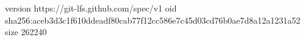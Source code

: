 version https://git-lfs.github.com/spec/v1
oid sha256:aceb3d3c1f610ddeadf80cab77f12cc586e7c45d03cd76b0ae7d8a12a1231a52
size 262240
